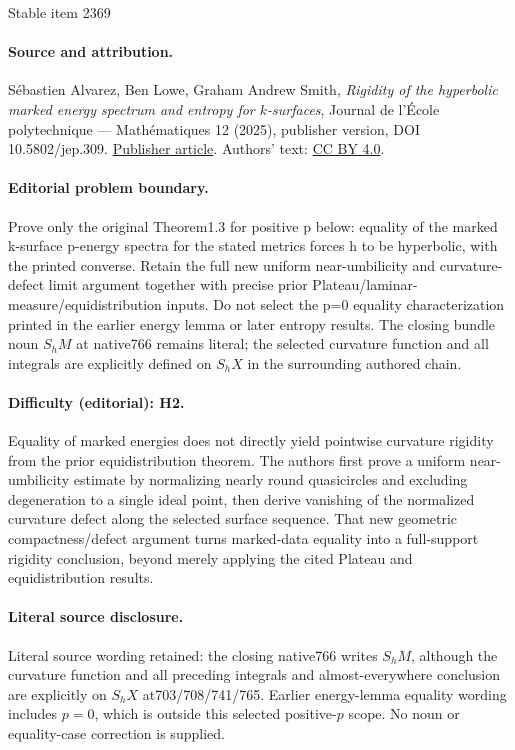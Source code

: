 \documentclass[11pt]{article}
\theoremstyle{plain}
\theoremstyle{definition}
\begin{document}
\begin{center}{\Large Stable item 2369}\end{center}
\paragraph{Source and attribution.}
Sébastien Alvarez, Ben Lowe, Graham Andrew Smith, \emph{Rigidity of the hyperbolic marked energy spectrum and entropy for $k$-surfaces}, Journal de l’École polytechnique — Mathématiques 12 (2025), publisher version, DOI 10.5802/jep.309. \href{https://jep.centre-mersenne.org/articles/10.5802/jep.309/}{Publisher article}. Authors' text: \href{https://creativecommons.org/licenses/by/4.0/}{CC BY 4.0}.
\paragraph{Editorial problem boundary.}
Prove only the original Theorem1.3 for positive p below: equality of the marked k-surface p-energy spectra for the stated metrics forces h to be hyperbolic, with the printed converse. Retain the full new uniform near-umbilicity and curvature-defect limit argument together with precise prior Plateau/laminar-measure/equidistribution inputs. Do not select the p=0 equality characterization printed in the earlier energy lemma or later entropy results. The closing bundle noun $S_hM$ at native766 remains literal; the selected curvature function and all integrals are explicitly defined on $S_hX$ in the surrounding authored chain.
\paragraph{Difficulty (editorial): H2.}
Equality of marked energies does not directly yield pointwise curvature rigidity from the prior equidistribution theorem. The authors first prove a uniform near-umbilicity estimate by normalizing nearly round quasicircles and excluding degeneration to a single ideal point, then derive vanishing of the normalized curvature defect along the selected surface sequence. That new geometric compactness/defect argument turns marked-data equality into a full-support rigidity conclusion, beyond merely applying the cited Plateau and equidistribution results.
\paragraph{Literal source disclosure.}
Literal source wording retained: the closing native766 writes $S_hM$, although the curvature function and all preceding integrals and almost-everywhere conclusion are explicitly on $S_hX$ at703/708/741/765. Earlier energy-lemma equality wording includes $p=0$, which is outside this selected positive-$p$ scope. No noun or equality-case correction is supplied.
\end{document}
